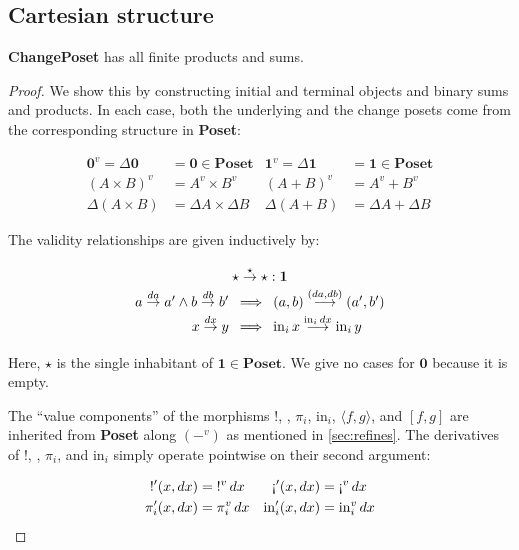 \documentclass[nomarginums]{rntz}
\newcommand\cat\textbf
\newcommand\CP{\cat{ChangePoset}}
\newcommand\Poset{\cat{Poset}}
\newcommand\initObj{\ensuremath{\mathbold{0}}}
\newcommand\termObj{\ensuremath{\mathbold{1}}}
\newcommand\D\Delta
\newcommand\x\times
\newcommand\tuple[1]{\left({#1}\right)}
\newcommand\triv{\star}
\newcommand\injc{\mathrm{in}}
\newcommand\inj[1]{\injc_{#1}\,}
\newcommand\validarrow{{\to}}
\newcommand\longvalidarrow{{\longrightarrow}}
\newcommand\valid[1]{\mathrel{\overset{#1}{\validarrow}}}
\newcommand\longvalid[1]{\mathrel{\overset{#1}{\longvalidarrow}}}
\newcommand\vals[1]{#1^v} %
\newcommand\chgs[1]{\D{#1}}
\newcommand\fork[1]{\langle{#1}\rangle}
\newcommand\funct[1]{\vals{#1}}
\newcommand\deriv[1]{#1'}
\begin{document}

\subsection{Cartesian structure}

\begin{theorem}
  \CP{} has all finite products and sums.
\end{theorem}

\begin{proof}
  We show this by constructing initial and terminal objects and binary sums and
  products. In each case, both the underlying and the change posets come from
  the corresponding structure in \Poset{}:

  \begin{align*}
    \vals \initObj = \chgs \initObj &= \initObj \in \Poset &
    \vals \termObj = \chgs \termObj &= \termObj \in \Poset \\
    \vals{(A \x B)} &= \vals A \x \vals B &
    \vals{(A + B)} &= \vals A + \vals B \\
    \chgs{(A \x B)} &= \chgs A \x \chgs B &
    \chgs{(A + B)} &= \chgs A + \chgs B
  \end{align*}

  \noindent The validity relationships are given inductively by:

  \[\setlength\arraycolsep{.25em}\def\arraystretch{1.45}
  \begin{array}{rcl}
    \multicolumn{3}{c}{\triv \valid{\triv} \triv : \termObj} \\
    a \valid{da} a' \wedge b \valid{db} b'
    &\implies& \tuple{a,b} \longvalid{\tuple{da,db}} \tuple{a',b'} \\
    x \valid{dx} y &\implies&
    \inj{i} x \longvalid{\inj{i} dx} \inj{i} y
  \end{array}\]

  \noindent Here, $\triv$ is the single inhabitant of $\termObj \in \Poset$. We
  give no cases for $\initObj$ because it is empty.

  The ``value components'' of the morphisms $!$, \textexclamdown, $\pi_i$,
  $\injc_i$, $\fork{f, g}$, and $[f,g]$ are inherited from \Poset{} along
  $(\vals{-})$ as mentioned in \cref{sec:refines}. The derivatives of $!$,
  \textexclamdown, $\pi_i$, and $\injc_i$ simply operate pointwise on their
  second argument:

  \begin{align*}
    {\deriv{!}}(x,dx) &= {\funct{!}}\,dx &
    \deriv{\text{\textexclamdown}}(x,dx) &= \funct{\text{\textexclamdown}}\,dx\\
    \deriv\pi_i(x,dx) &= \funct{\pi_i}\,dx &
    \deriv\injc_i(x,dx) &= \funct{\injc_i}\,dx
  \end{align*}


\end{proof}
\end{document}
